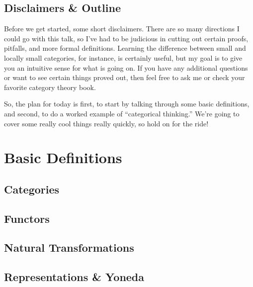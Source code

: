 \documentclass{notes}
\begin{document}
\subsection{Disclaimers \& Outline}

\vspace{-3ex}
Before we get started, some short disclaimers. There are so many directions I could go with this talk, so I've had to be judicious in cutting out certain proofs, pitfalls, and more formal definitions. Learning the difference between small and locally small categories, for instance, is certainly useful, but my goal is to give you an intuitive sense for what is going on. If you have any additional questions or want to see certain things proved out, then feel free to ask me or check your favorite category theory book.

\vspace{-8.5ex}
So, the plan for today is first, to start by talking through some basic definitions, and second, to do a worked example of ``categorical thinking.'' We're going to cover some really cool things really quickly, so hold on for the ride!

\section{Basic Definitions}

\vspace{-3ex}

\subsection{Categories}

\vspace{-3ex}

\subsection{Functors}

\vspace{-3ex}

\subsection{Natural Transformations}

\vspace{-3ex}

\subsection{Representations \& Yoneda}
\end{document}
